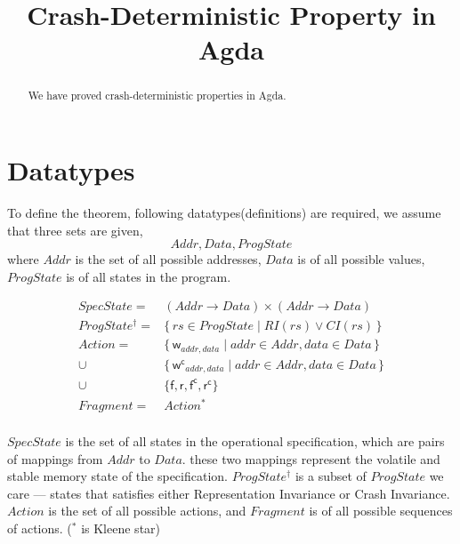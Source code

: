 \documentclass[a4paper,11pt]{article}
\theoremstyle{definition}
\begin{document}
\title{Crash-Deterministic Property in Agda}
\maketitle

\begin{abstract}
	We have proved crash-deterministic properties in Agda.
\end{abstract}


\section{Datatypes}

To define the theorem, following datatypes(definitions) are required,
we assume that three sets are given,  
$$\mathit{Addr}, \mathit{Data}, \mathit{ProgState}$$
where $\mathit{Addr}$ is the set of all possible addresses, $\mathit{Data}$ is of all possible values, $\mathit{ProgState}$ is of all states in the program.

\begin{align*}
	\mathit{SpecState} ={} &(Addr \to Data) \times (Addr \to Data)\\
	\mathit{ProgState^{\dagger}} ={} &\{\, \mathit{rs} \in \mathit{ProgState} \mid \mathit{RI(rs) \lor CI(rs)} \,\}\\
	\mathit{Action} ={} &\{\,\mathsf w_{addr, data} \mid addr \in Addr, data \in Data \,\} \\
	\cup \ &\{\, \mathsf {w^c}_{addr, data} \mid addr \in Addr, data \in Data \,\}\\
	\cup \ &\{ \mathsf f,\mathsf r,\mathsf {f^c},\mathsf {r^c}\}\\
	\mathit{Fragment} ={} &\mathit{Action^*}\\
\end{align*}

$\mathit{SpecState}$ is the set of all states in the operational specification, which are pairs of mappings from $Addr$ to $Data$. these two mappings represent the volatile and stable memory state of the specification. $ProgState^\dagger$ is a subset of $ProgState$ we care \---- states that satisfies either Representation Invariance or Crash Invariance. $Action$ is the set of all possible actions, and $\mathit{Fragment}$ is of all possible sequences of actions. ($^*$ is Kleene star)
\end{document}
